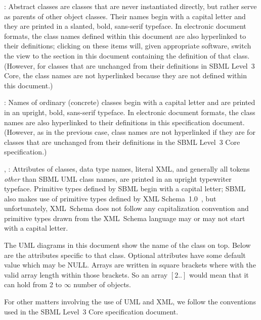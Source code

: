 \begin{description}

\item {}: Abstract classes are classes that
  are never instantiated directly, but rather serve as parents of other
  object classes.  Their names begin with a capital letter and they are
  printed in a slanted, bold, sans-serif typeface.  In electronic
  document formats, the class names defined within this document are
  also hyperlinked to their definitions; clicking
  on these items will, given appropriate software, switch the view to
  the section in this document containing the definition of that class.
  (However, for classes that are unchanged from their definitions in
  SBML Level~3 Core, the class names are not hyperlinked because they
  are not defined within this document.)

\item {}: Names of ordinary (concrete) classes begin with a
  capital letter and are printed in an upright, bold, sans-serif
  typeface.  In electronic document formats, the class names are also
  hyperlinked to their definitions in this specification document.
  (However, as in the previous case, class names are not hyperlinked if
  they are for classes that are unchanged from their definitions in the
  SBML Level~3 Core specification.)

\item {}, : Attributes of classes, data
  type names, literal XML, and generally all tokens \emph{other} than
  SBML UML class names, are printed in an upright typewriter typeface.
  Primitive types defined by SBML begin with a capital letter; SBML also
  makes use of primitive types defined by XML
  Schema~1.0~\citep{biron:2000,fallside:2000,thompson:2000}, but
  unfortunately, XML~Schema does not follow any capitalization
  convention and primitive types drawn from the XML~Schema language may
  or may not start with a capital letter.

\end{description}

The UML diagrams in this document show the name of the class on top. Below are the attributes specific to that class. Optional attributes have some default value which may be NULL. Arrays are written in square brackets where with the valid array length within those brackets. So an array $[2..]$ would mean that it can hold from 2 to $\infty$ number of objects.

For other matters involving the use of UML and XML, we follow the
conventions used in the SBML Level~3 Core specification document.


